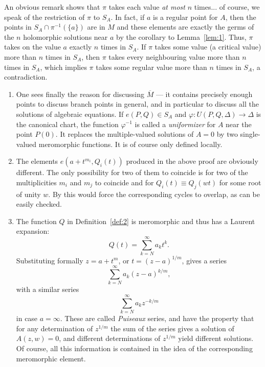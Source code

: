 \documentclass[a4paper,11pt]{article}
\begin{document}
\begin{myproof}
  An obvious remark shows that $\pi$ takes each value \emph{at most}
  $n$ times... of course, we speak of the restriction of $\pi$ to
  $S_A$.  In fact, if $a$ is a regular point for $A$, then the points
  in $S_A \cap \pi^{-1}(\{a\})$ are in $M$ and these elements are
  exactly the germs of the $n$ holomorphic solutions near $a$ by the
  corollary to Lemma~\ref{lem:1}.  Thus, $\pi$ takes on the value $a$
  exactly $n$ times in $S_A$.  If $\pi$ takes some value (a critical
  value) more than $n$ times in $S_A$, then $\pi$ takes every
  neighbouring value more than $n$ times in $S_A$, which implies $\pi$
  takes some regular value more than $n$ times in $S_A$, a
  contradiction.
\end{myproof}

\begin{rem}
  \begin{enumerate}
  \item One sees finally the reason for discussing $\overline{M}$ ---
    it contains precisely enough points to discuss branch points in
    general, and in particular to discuss all the solutions of
    algebraic equations.  If $e(P,Q) \in S_A$ and $\varphi : U(P, Q,
    \Delta) \to \Delta$ is the canonical chart, the function
    $\varphi^{-1}$ is called a \emph{uniformizer} for $A$ near the
    point $P(0)$.  It replaces the multiple-valued solutions of $A =
    0$ by two single-valued meromorphic functions.  It is of course
    only defined locally.

  \item The elements $e(a+t^{m_i}, Q_i(t))$ produced in the above
    proof are obviously different.  The only possibility for two of
    them to coincide is for two of the multiplicities $m_i$ and $m_j$
    to coincide and for $Q_i(t) \equiv Q_j(wt)$ for some root of unity
    $w$.  By this would force the corresponding cycles to overlap, as
    can be easily checked.

  \item The function $Q$ in Definition~\ref{def:2} is meromorphic and
    thus has a Laurent expansion:
    $$
    Q(t) = \sum_{k=N}^{\infty} a_k t^k.
    $$
    Substituting formally $z = a + t^m$, or $t = (z-a)^{1/m}$, gives a
    series
    $$
    \sum_{k=N}^{\infty} a_k(z-a)^{k/m},
    $$
    with a similar series
    $$
    \sum_{k=N}^{\infty} a_k z^{-k/m}
    $$
    in case $a = \infty$.  These are called \emph{Puiseaux} series,
    and have the property that for any determination of $z^{1/m}$ the
    sum of the series gives a solution of $A(z,w) = 0$, and different
    determinations of $z^{1/m}$ yield different solutions.  Of course,
    all this information is contained in the idea of the corresponding
    meromorphic element.


\end{enumerate}
\end{rem}
\end{document}
